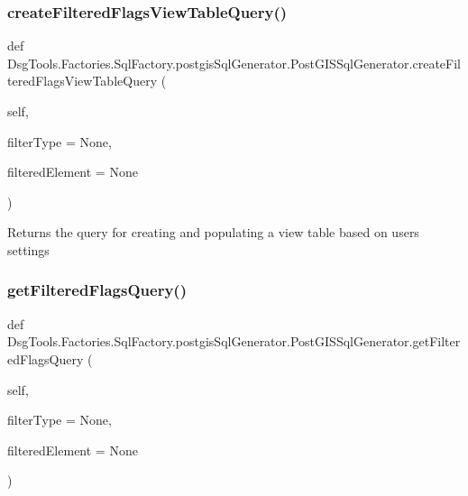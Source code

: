 \subsubsection{\texorpdfstring{create\+Filtered\+Flags\+View\+Table\+Query()}{createFilteredFlagsViewTableQuery()}}
{\footnotesize\ttfamily def Dsg\+Tools.\+Factories.\+Sql\+Factory.\+postgis\+Sql\+Generator.\+Post\+G\+I\+S\+Sql\+Generator.\+create\+Filtered\+Flags\+View\+Table\+Query (\begin{DoxyParamCaption}\item[{}]{self,  }\item[{}]{filter\+Type = {\ttfamily None},  }\item[{}]{filtered\+Element = {\ttfamily None} }\end{DoxyParamCaption})}

\begin{DoxyVerb}Returns the query for creating and populating
a view table based on users settings
\end{DoxyVerb}
 \mbox{\label{class_dsg_tools_1_1_factories_1_1_sql_factory_1_1postgis_sql_generator_1_1_post_g_i_s_sql_generator_aa60e66a7b85ec413c92536b65eac6718}} 
\subsubsection{\texorpdfstring{get\+Filtered\+Flags\+Query()}{getFilteredFlagsQuery()}}
{\footnotesize\ttfamily def Dsg\+Tools.\+Factories.\+Sql\+Factory.\+postgis\+Sql\+Generator.\+Post\+G\+I\+S\+Sql\+Generator.\+get\+Filtered\+Flags\+Query (\begin{DoxyParamCaption}\item[{}]{self,  }\item[{}]{filter\+Type = {\ttfamily None},  }\item[{}]{filtered\+Element = {\ttfamily None} }\end{DoxyParamCaption})}


